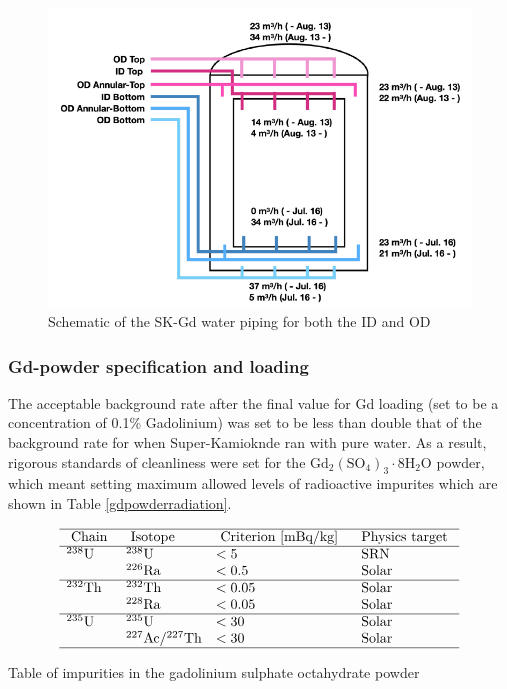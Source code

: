 \begin{figure}[H]
    \includegraphics[width=\textwidth]{Figures/gd_pipes.png}
    \caption{Schematic of the SK-Gd water piping for both the ID and OD}
    \label{fig:gd_pipes}
\end{figure}


\subsubsection{Gd-powder specification and loading}

The acceptable background rate after the final value for Gd loading (set to be a concentration of 0.1\% Gadolinium) was set to be less than double that of the background rate for when Super-Kamioknde ran with pure water. As a result, rigorous standards of cleanliness were set for the $\mathrm{Gd}_{2}\left(\mathrm{SO}_{4}\right)_{3} \cdot 8 \mathrm{H}_{2} \mathrm{O}$ powder, which meant setting maximum allowed levels of radioactive impurites which are shown in Table \ref{gdpowderradiation}.


\begin{table}[H]

    $$
    \begin{array}{llll}
    \hline \text { Chain } & \text { Isotope } & \text { Criterion [mBq/kg] } & \text { Physics target } \\
        \hline{ }^{238} \mathrm{U} & { }^{238} \mathrm{U} & <5 & \text { SRN } \\
    & { }^{226} \mathrm{Ra} & <0.5 & \text { Solar } \\
    \hline{ }^{232} \mathrm{Th} & { }^{232} \mathrm{Th} & <0.05 & \text { Solar } \\
    & { }^{228} \mathrm{Ra} & <0.05 & \text { Solar } \\
    \hline{ }^{235} \mathrm{U} & { }^{235} \mathrm{U} & <30 & \text { Solar } \\
    & { }^{227} \mathrm{Ac} /{ }^{227} \mathrm{Th} & <30 & \text { Solar } \\
    \hline
    \end{array}
    $$
\caption{Table of impurities in the gadolinium sulphate octahydrate powder}
\label{gdpowderradiation}
\end{table}


